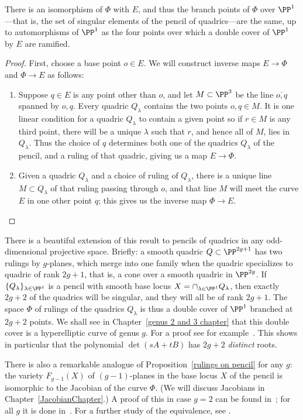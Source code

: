 \begin{proposition}\label{rulings on pencil}
There is an isomorphism of $\Phi$ with $E$, and thus the branch points of $\Phi$ over $\PP^1$---that is, the set of singular elements of the pencil of quadrics---are the same, up to automorphisms of $\PP^1$ as the four points over which a double cover of $\PP^1$ by $E$ are ramified.
\end{proposition} 


\begin{proof}
First, choose a base point $o \in E$. We will construct inverse maps $E \to \Phi$ and $\Phi \to E$ as follows:
\begin{enumerate}

\item Suppose $q \in E$ is any point other than $o$, and let $M\subset \PP^3$ be the line $\overline{o,q}$ spanned by $o,q$. Every quadric $Q_\lambda$ contains the two points $o, q \in M$. It is one linear condition
for a quadric $Q_{\lambda}$ to contain a given point  so if $r\in M$ is any third point, there will be a unique $\lambda$ such that $r$, and hence all of $M$, lies in $Q_\lambda$. Thus the choice of $q$ determines both one of the quadrics $Q_\lambda$ of the pencil, and a ruling of that quadric, giving us a map $E \to \Phi$.

\item  Given a quadric $Q_\lambda$ and a choice of ruling of $Q_\lambda$, there is a unique line $M \subset Q_\lambda$ of that ruling passing through $o$, and that line $M$ will meet the curve $E$ in one other point $q$; this gives us the inverse map $\Phi \to E$.
\end{enumerate}
\end{proof}

\begin{fact}
 There is a beautiful extension of this result to pencils of quadrics in any odd-dimensional projective space. Briefly: a smooth quadric $Q \subset \PP^{2g+1}$ has two rulings by $g$-planes, which merge into one family when the quadric specializes to quadric of rank $2g+1$, that is, a cone over a smooth quadric in $\PP^{2g}$. If $\{Q_\lambda\}_{\lambda \in \PP^1}$ is a pencil with smooth base locus $X = \cap_{\lambda \in \PP^1} Q_\lambda$, then exactly $2g+2$ of the quadrics will be singular, and they will all be of rank $2g+1$. The space $\Phi$ of rulings of the quadrics $Q_\lambda$ is thus a double cover of $\PP^1$ branched at $2g+2$  points. We shall see in Chapter~\ref{genus 2 and 3 chapter} that this double cover is a hyperelliptic curve of genus $g$. For a proof see for example~\cite[Proposition 22.34]{Harris1995}.
 This shows in particular that the polynomial $\det(sA+tB)$ has $2g+2$ \emph{distinct} roots. 

 There is also a remarkable analogue of Proposition~\ref{rulings on pencil} for any $g$: the variety $F_{g-1}(X)$ of $(g-1)$-planes in the base locus $X$ of the pencil is isomorphic to the Jacobian of the  curve $\Phi$. (We will discuss Jacobians in Chapter~\ref{JacobianChapter}.) A proof of this in case $g=2$ can be found in~\cite{Griffiths-Harris1978}; for all $g$ it is done in~\cite{Donagi}. For a further study of the equivalence, see \cite{Eisenbud-Schreyer}.
\end{fact}

